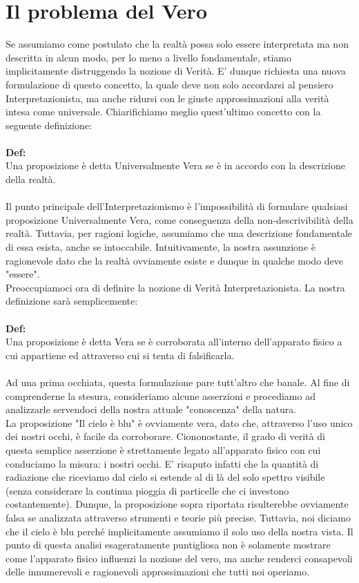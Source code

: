 \documentclass[]{article}
\begin{document}
	\section{Il problema del Vero}
	Se assumiamo come postulato che la realtà possa solo essere interpretata ma non descritta in alcun modo, per lo meno a livello fondamentale, stiamo implicitamente distruggendo la nozione di Verità. E' dunque richiesta  una nuova formulazione di questo concetto, la quale deve non solo accordarsi al pensiero Interpretazionista, ma anche ridursi con le giuste approssimazioni alla verità intesa come universale.
	Chiarifichiamo meglio quest'ultimo concetto con la seguente definizione:\\\\
	\textbf{Def:}\\
	Una proposizione è detta Universalmente Vera se è in accordo con la descrizione della realtà.\\
	\\
	Il punto principale dell'Interpretazionismo è l'impossibilità di formulare qualsiasi proposizione Universalmente Vera, come conseguenza della non-descrivibilità della realtà. Tuttavia, per ragioni logiche, assumiamo che una descrizione fondamentale di essa esista, anche se intoccabile. Intuitivamente, la nostra assunzione è ragionevole dato che la realtà ovviamente esiste e dunque in qualche modo deve "essere". \\
	Preoccupiamoci ora di definire la nozione di Verità Interpretazionista. La nostra definizione sarà semplicemente:\\
	\\
	\textbf{Def:}\\
	Una proposizione è detta Vera se è corroborata all'interno dell'apparato fisico a cui appartiene ed attraverso cui si tenta di falsificarla.\\
	\\
	Ad una prima occhiata, questa formulazione pare tutt'altro che banale. Al fine di comprenderne la stesura, consideriamo alcune asserzioni e procediamo ad analizzarle servendoci della nostra attuale "conoscenza" della natura.\\
	La proposizione "Il cielo è blu" è ovviamente vera, dato che, attraverso l'uso unico dei nostri occhi, è facile da corroborare. Ciononostante, il grado di verità di questa semplice asserzione è strettamente legato all'apparato fisico con cui conduciamo la misura: i nostri occhi. E' risaputo infatti che la quantità di radiazione che riceviamo dal cielo si estende al di là del solo spettro visibile (senza considerare la continua pioggia di particelle che ci investono costantemente). Dunque, la proposizione sopra riportata risulterebbe ovviamente falsa se analizzata attraverso strumenti e teorie più precise. Tuttavia, noi diciamo che il cielo è blu perché implicitamente assumiamo il solo uso della nostra vista. Il punto di questa analisi esageratamente puntigliosa non è solamente mostrare come l'apparato fisico influenzi la nozione del vero, ma anche renderci consapevoli delle innumerevoli e ragionevoli approssimazioni che tutti noi operiamo.\\
\end{document}
